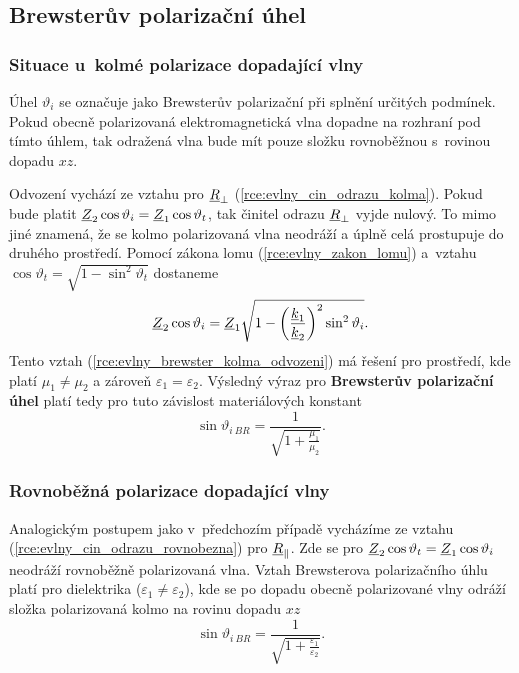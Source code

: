 \subsection{Brewsterův polarizační úhel}
\subsubsection*{Situace u~kolmé polarizace dopadající vlny}
Úhel $\vartheta_{i}$ se označuje jako Brewsterův polarizační při splnění určitých podmínek. Pokud obecně polarizovaná elektromagnetická vlna dopadne na rozhraní pod tímto úhlem, tak odražená vlna bude mít pouze složku rovnoběžnou s~rovinou dopadu $xz$.

Odvození vychází ze vztahu pro ${\underline{R}}_{\perp}$ (\ref{rce:evlny_cin_odrazu_kolma}). Pokud bude platit ${\underline{Z}}_{2}\cos\vartheta_{i} = {\underline{Z}}_{1}\cos\vartheta_{t}$, tak činitel odrazu ${\underline{R}}_{\perp}$ vyjde nulový. To mimo jiné znamená, že se kolmo polarizovaná vlna neodráží a úplně celá prostupuje do druhého prostředí. Pomocí zákona lomu (\ref{rce:evlny_zakon_lomu}) a~vztahu $\cos\vartheta_{t} = \sqrt{1-\sin^{2}\vartheta_{t}}$ dostaneme
\begin{equation}
	{\underline{Z}}_{2}\cos\vartheta_{i} = {\underline{Z}}_{1}\sqrt{1-\bigg(\frac{{\underline{k}}_{1}}{{\underline{k}}_{2}}\bigg)^{2}\sin^{2}\vartheta_{i}}.
	\label{rce:evlny_brewster_kolma_odvozeni}
\end{equation}
Tento vztah (\ref{rce:evlny_brewster_kolma_odvozeni}) má řešení pro prostředí, kde platí $\mu_{1} \ne \mu_{2}$ a zároveň $\varepsilon_{1} = \varepsilon_{2}$. Výsledný výraz pro {\bf Brewsterův polarizační úhel} platí tedy pro tuto závislost materiálových konstant
\begin{equation}
	\sin\vartheta_{i\ BR} = \frac{1}{\sqrt{1+\frac{\mu_{1}}{\mu_{2}}}}.
	\label{rce:evlny_brewster_kolma}
\end{equation}

\subsubsection*{Rovnoběžná polarizace dopadající vlny}
Analogickým postupem jako v~předchozím případě vycházíme ze vztahu (\ref{rce:evlny_cin_odrazu_rovnobezna}) pro ${\underline{R}}_{\parallel}$. Zde se pro ${\underline{Z}}_{2}\cos\vartheta_{t} = {\underline{Z}}_{1}\cos\vartheta_{i}$ neodráží rovnoběžně polarizovaná vlna. Vztah Brewsterova polarizačního úhlu platí pro dielektrika ($\varepsilon_{1} \ne \varepsilon_{2}$), kde se po dopadu obecně polarizované vlny odráží složka polarizovaná kolmo na rovinu dopadu $xz$
\begin{equation}
	\sin\vartheta_{i\ BR} = \frac{1}{\sqrt{1+\frac{\varepsilon_{1}}{\varepsilon_{2}}}}.
	\label{rce:evlny_brewster_kolma}
\end{equation}
\newpage

